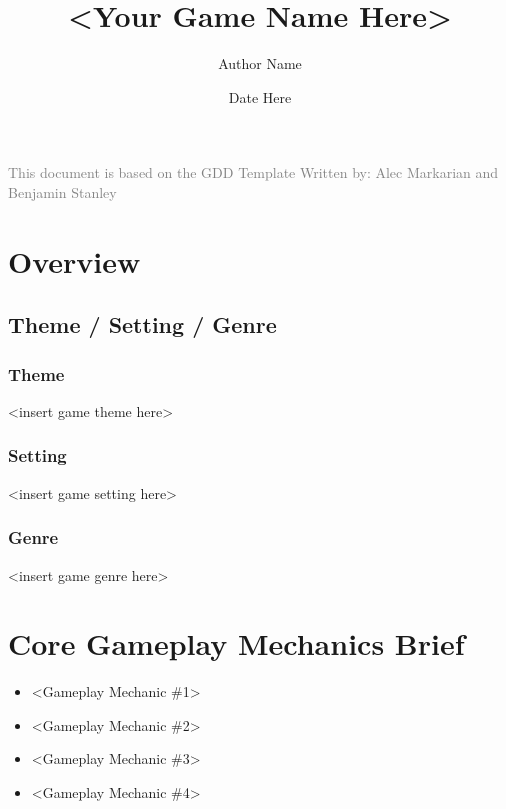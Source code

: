 \documentclass[14pt]{article}
\title{<Your Game Name Here>}
\author{Author Name}
\date{Date Here}
\begin{document}

\clearpage
\maketitle
\thispagestyle{empty}
\vspace{8cm}

\begin{center}
    \textcolor{gray}{\large This document is based on the GDD Template Written by: Alec Markarian and Benjamin Stanley}
\end{center}
\pagebreak

\thispagestyle{empty}
\tableofcontents
\thispagestyle{empty}
\pagebreak

\section{Overview}
\subsection{Theme / Setting / Genre}
\subsubsection{Theme}
<insert game theme here>

\subsubsection{Setting}
<insert game setting here>

\subsubsection{Genre}
<insert game genre here>

\section{Core Gameplay Mechanics Brief}
\begin{itemize}
    \item <Gameplay Mechanic \#1>
    \item <Gameplay Mechanic \#2>
    \item <Gameplay Mechanic \#3>  
    \item <Gameplay Mechanic \#4>
\end{itemize}
\end{document}
